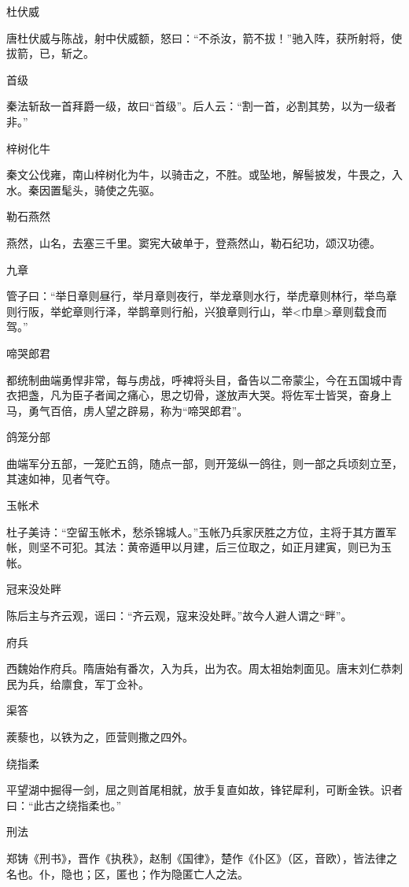 \documentclass[a4paper,12pt,UTF8,twoside]{ctexbook}
\begin{document}
    杜伏威
    
    唐杜伏威与陈战，射中伏威额，怒曰：“不杀汝，箭不拔！”驰入阵，获所射将，使拔箭，已，斩之。
    
    首级
    
    秦法斩敌一首拜爵一级，故曰“首级”。后人云：“割一首，必割其势，以为一级者非。”
    
    梓树化牛
    
    秦文公伐雍，南山梓树化为牛，以骑击之，不胜。或坠地，解髻披发，牛畏之，入水。秦因置髦头，骑使之先驱。
    
    勒石燕然
    
    燕然，山名，去塞三千里。窦宪大破单于，登燕然山，勒石纪功，颂汉功德。
    
    九章
    
    管子曰：“举日章则昼行，举月章则夜行，举龙章则水行，举虎章则林行，举鸟章则行阪，举蛇章则行泽，举鹊章则行船，兴狼章则行山，举<巾臯>章则载食而驾。”
    
    啼哭郎君
    
    都统制曲端勇悍非常，每与虏战，呼裨将头目，备告以二帝蒙尘，今在五国城中青衣把盏，凡为臣子者闻之痛心，思之切骨，遂放声大哭。将佐军士皆哭，奋身上马，勇气百倍，虏人望之辟易，称为“啼哭郎君”。
    
    鸽笼分部
    
    曲端军分五部，一笼贮五鸽，随点一部，则开笼纵一鸽往，则一部之兵顷刻立至，其速如神，见者气夺。
    
    玉帐术
    
    杜子美诗：“空留玉帐术，愁杀锦城人。”玉帐乃兵家厌胜之方位，主将于其方置军帐，则坚不可犯。其法：黄帝遁甲以月建，后三位取之，如正月建寅，则已为玉帐。
    
    冠来没处畔
    
    陈后主与齐云观，谣曰：“齐云观，寇来没处畔。”故今人避人谓之“畔”。
    
    府兵
    
    西魏始作府兵。隋唐始有番次，入为兵，出为农。周太祖始刺面见。唐末刘仁恭刺民为兵，给廪食，军丁佥补。
    
    渠答
    
    蒺藜也，以铁为之，匝营则撒之四外。
    
    绕指柔
    
    平望湖中掘得一剑，屈之则首尾相就，放手复直如故，锋铓犀利，可断金铁。识者曰：“此古之绕指柔也。”
    
    刑法
    
    郑铸《刑书》，晋作《执秩》，赵制《国律》，楚作《仆区》（区，音欧），皆法律之名也。仆，隐也；区，匿也；作为隐匿亡人之法。
    
\end{document}
